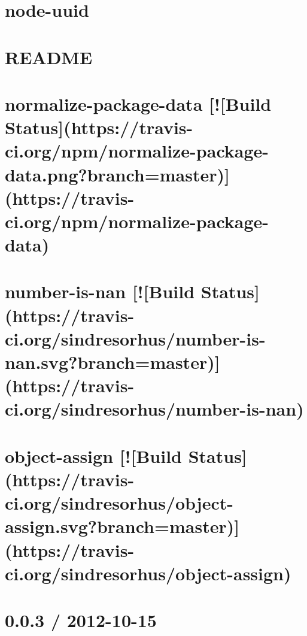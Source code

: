 \documentclass[twoside]{book}
\newcommand{\+}{\discretionary{\mbox{\scriptsize$\hookleftarrow$}}{}{}}
\begin{document}
\chapter{node-\/uuid}
\label{md_app_web_node_modules_node-uuid__r_e_a_d_m_e}

\chapter{R\+E\+A\+D\+ME}
\label{md_app_web_node_modules_nopt__r_e_a_d_m_e}

\chapter{normalize-\/package-\/data \mbox{[}!\mbox{[}Build Status\mbox{]}(https\+://travis-\/ci.org/npm/normalize-\/package-\/data.png?branch=master)\mbox{]}(https\+://travis-\/ci.org/npm/normalize-\/package-\/data)}
\label{md_app_web_node_modules_normalize-package-data__r_e_a_d_m_e}

\chapter{number-\/is-\/nan \mbox{[}!\mbox{[}Build Status\mbox{]}(https\+://travis-\/ci.org/sindresorhus/number-\/is-\/nan.svg?branch=master)\mbox{]}(https\+://travis-\/ci.org/sindresorhus/number-\/is-\/nan)}
\label{md_app_web_node_modules_number-is-nan_readme}

\chapter{object-\/assign \mbox{[}!\mbox{[}Build Status\mbox{]}(https\+://travis-\/ci.org/sindresorhus/object-\/assign.svg?branch=master)\mbox{]}(https\+://travis-\/ci.org/sindresorhus/object-\/assign)}
\label{md_app_web_node_modules_object-assign_readme}

\chapter{0.0.3 / 2012-\/10-\/15}
\label{md_app_web_node_modules_object-component__history}

\end{document}
